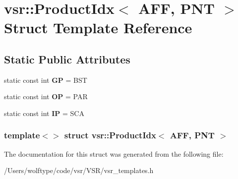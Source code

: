 \hypertarget{structvsr_1_1_product_idx_3_01_a_f_f_00_01_p_n_t_01_4}{\section{vsr\-:\-:Product\-Idx$<$ A\-F\-F, P\-N\-T $>$ Struct Template Reference}
\label{structvsr_1_1_product_idx_3_01_a_f_f_00_01_p_n_t_01_4}
}
\subsection*{Static Public Attributes}
\begin{DoxyCompactItemize}
\item 
\hypertarget{structvsr_1_1_product_idx_3_01_a_f_f_00_01_p_n_t_01_4_a98ed57d97086022425522a401b04b228}{static const int {\bfseries G\-P} = B\-S\-T}\label{structvsr_1_1_product_idx_3_01_a_f_f_00_01_p_n_t_01_4_a98ed57d97086022425522a401b04b228}

\item 
\hypertarget{structvsr_1_1_product_idx_3_01_a_f_f_00_01_p_n_t_01_4_a6a067ac6707deea8b2cc06d5a4b76116}{static const int {\bfseries O\-P} = P\-A\-R}\label{structvsr_1_1_product_idx_3_01_a_f_f_00_01_p_n_t_01_4_a6a067ac6707deea8b2cc06d5a4b76116}

\item 
\hypertarget{structvsr_1_1_product_idx_3_01_a_f_f_00_01_p_n_t_01_4_a5e5903f8623c86603cadd829db9be3ac}{static const int {\bfseries I\-P} = S\-C\-A}\label{structvsr_1_1_product_idx_3_01_a_f_f_00_01_p_n_t_01_4_a5e5903f8623c86603cadd829db9be3ac}

\end{DoxyCompactItemize}
\subsubsection*{template$<$$>$ struct vsr\-::\-Product\-Idx$<$ A\-F\-F, P\-N\-T $>$}



The documentation for this struct was generated from the following file\-:\begin{DoxyCompactItemize}
\item 
/\-Users/wolftype/code/vsr/\-V\-S\-R/vsr\-\_\-templates.\-h\end{DoxyCompactItemize}
